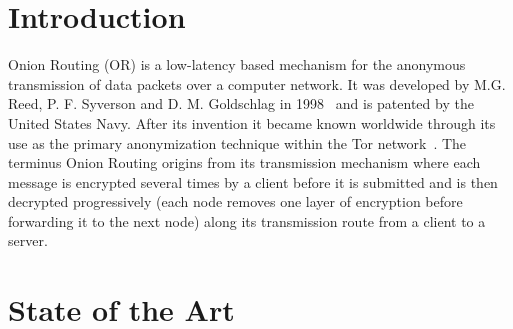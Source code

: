 \documentclass{sig-alternate}
\begin{document}


\section{Introduction}
Onion Routing (OR) is a low-latency based mechanism for the anonymous transmission of data packets over a computer network. It was developed by M.G. Reed, P. F. Syverson and D. M. Goldschlag in 1998~\cite{reed1998anonymous} and is patented by the United States Navy. After its invention it became known worldwide through its use as the primary anonymization technique within the Tor network~\cite{tor}. The terminus Onion Routing origins from its transmission mechanism where each message is encrypted several times by a client before it is submitted and is then decrypted progressively (each node removes one layer of encryption before forwarding it to the next node) along its transmission route from a client to a server. 


\section{State of the Art}
\end{document}
